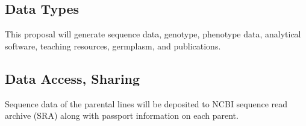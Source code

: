 \setcounter{page}{1}
\renewcommand{\thepage}{Data Management Plan - Page \arabic{page} of 2}

% 
% 
% 
% 
% 
% 

\subsection*{Data Types}

This proposal will generate sequence data, genotype, phenotype data, analytical software, teaching resources, germplasm, and publications.

\subsection*{Data Access, Sharing}

Sequence data of the parental lines will be deposited to NCBI sequence read archive (SRA) along with passport information on each parent. 

